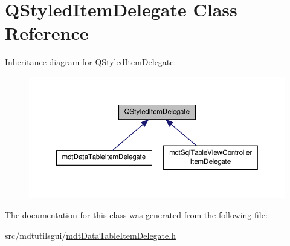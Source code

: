 \hypertarget{class_q_styled_item_delegate}{\section{Q\-Styled\-Item\-Delegate Class Reference}
\label{class_q_styled_item_delegate}
}


Inheritance diagram for Q\-Styled\-Item\-Delegate\-:
\nopagebreak
\begin{figure}[H]
\begin{center}
\leavevmode
\includegraphics[width=350pt]{class_q_styled_item_delegate__inherit__graph}
\end{center}
\end{figure}


The documentation for this class was generated from the following file\-:\begin{DoxyCompactItemize}
\item 
src/mdtutilsgui/\hyperlink{mdt_data_table_item_delegate_8h}{mdt\-Data\-Table\-Item\-Delegate.\-h}\end{DoxyCompactItemize}
